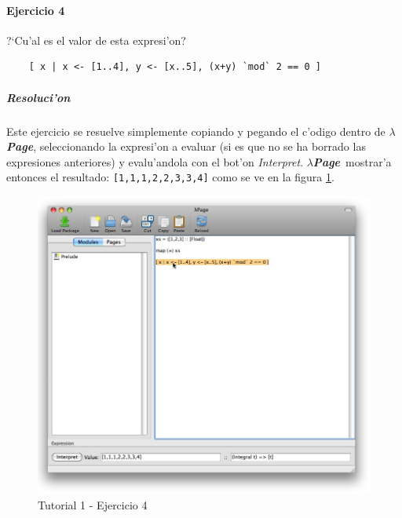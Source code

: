 \documentclass[a4paper]{article}
\newcommand{\hpage}{\textbf{\textsl{$\lambda$Page}}}
\begin{document}
\paragraph{Ejercicio 4}?`Cu'al es el valor de esta expresi'on?
\lstset{language=haskell, frame=single, tabsize=4}
\begin{center}\begin{lstlisting}
	[ x | x <- [1..4], y <- [x..5], (x+y) `mod` 2 == 0 ]
\end{lstlisting}\end{center}
\subparagraph{Resoluci'on}Este ejercicio se resuelve simplemente copiando y pegando el c'odigo dentro de \hpage, seleccionando la expresi'on a evaluar (si es que no se ha borrado las expresiones anteriores) y evalu'andola con el bot'on \textsl{Interpret}.  \hpage\ mostrar'a entonces el resultado: \texttt{[1,1,1,2,2,3,3,4]} como se ve en la figura \ref{tut102}.
\begin{figure}[hp]
	\begin{center}
        	\includegraphics[width=.75\textwidth]{pictures/tut1/02}
		\caption{Tutorial 1 - Ejercicio 4}
		\label{tut102}
	\end{center}
\end{figure}
\end{document}
